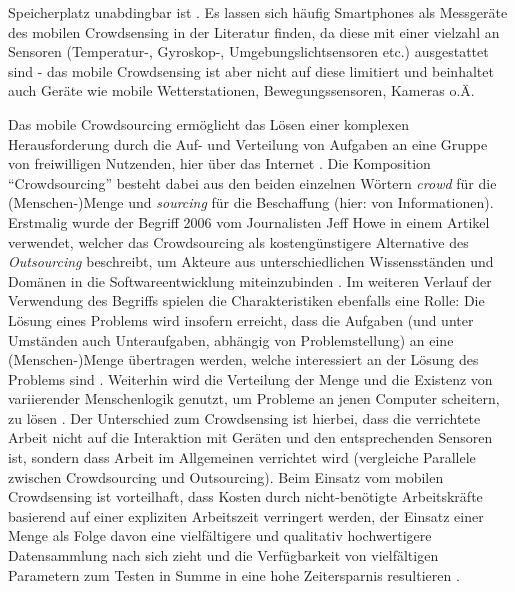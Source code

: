 Speicherplatz unabdingbar ist \cite{Ray2022}. Es lassen sich häufig Smartphones als Messgeräte des mobilen Crowdsensing in der Literatur finden, da diese mit einer vielzahl an Sensoren (Temperatur-, Gyroskop-, Umgebungslichtsensoren etc.) ausgestattet sind - das mobile Crowdsensing ist aber nicht auf diese limitiert und beinhaltet auch Geräte wie mobile Wetterstationen, Bewegungssensoren, Kameras o.Ä. 

Das mobile Crowdsourcing ermöglicht das Lösen einer komplexen Herausforderung durch die Auf- und Verteilung von Aufgaben an eine Gruppe von freiwilligen Nutzenden, hier über das Internet \cite {Wang2019}. Die Komposition \enquote{Crowdsourcing} besteht dabei aus den beiden einzelnen Wörtern \textit{crowd} für die (Menschen-)Menge und \textit{sourcing} für die Beschaffung (hier: von Informationen). Erstmalig wurde der Begriff 2006 vom Journalisten Jeff Howe in einem Artikel verwendet, welcher das Crowdsourcing als kostengünstigere Alternative des \textit{Outsourcing} beschreibt, um Akteure aus unterschiedlichen Wissensständen und Domänen in die Softwareentwicklung miteinzubinden \cite{Howe2006}. Im weiteren Verlauf der Verwendung des Begriffs spielen die Charakteristiken ebenfalls eine Rolle: Die Lösung eines Problems wird insofern erreicht, dass die Aufgaben (und unter Umständen auch Unteraufgaben, abhängig von Problemstellung) an eine (Menschen-)Menge übertragen werden, welche interessiert an der Lösung des Problems sind \cite{Ray2022}. Weiterhin wird die Verteilung der Menge und die Existenz von variierender Menschenlogik genutzt, um Probleme an jenen Computer scheitern, zu lösen \cite{Ray2022}. Der Unterschied zum Crowdsensing ist hierbei, dass die verrichtete Arbeit nicht auf die Interaktion mit Geräten und den entsprechenden Sensoren ist, sondern dass Arbeit im Allgemeinen verrichtet wird (vergleiche Parallele zwischen Crowdsourcing und Outsourcing). %
Beim Einsatz vom mobilen Crowdsensing ist vorteilhaft, dass Kosten durch nicht-benötigte Arbeitskräfte basierend auf einer expliziten Arbeitszeit verringert werden, der Einsatz einer Menge als Folge davon eine vielfältigere und qualitativ hochwertigere Datensammlung nach sich zieht und die Verfügbarkeit von vielfältigen Parametern zum Testen in Summe in eine hohe Zeitersparnis resultieren \cite{Ray2022}.

